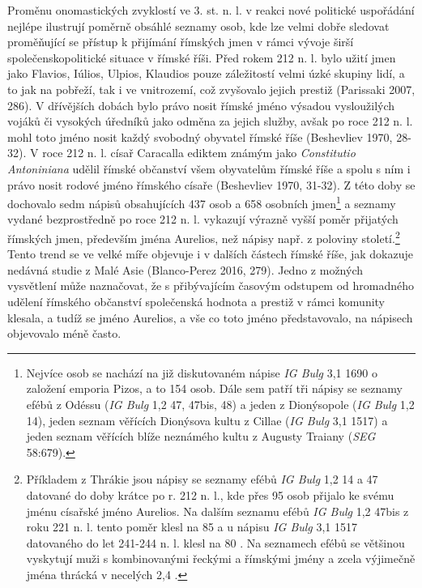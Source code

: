 Proměnu onomastických zvyklostí ve 3. st. n. l. v reakci nové politické uspořádání nejlépe ilustrují poměrně obsáhlé seznamy osob, kde lze velmi dobře sledovat proměňující se přístup k přijímání římských jmen v rámci vývoje širší společenskopolitické situace v římské říši. Před rokem 212 n. l. bylo užití jmen jako Flavios, Iúlios, Ulpios, Klaudios pouze záležitostí velmi úzké skupiny lidí, a to jak na pobřeží, tak i ve vnitrozemí, což zvyšovalo jejich prestiž (Parissaki 2007, 286). V dřívějších dobách bylo právo nosit římské jméno výsadou vysloužilých vojáků či vysokých úředníků jako odměna za jejich služby, avšak po roce 212 n. l. mohl toto jméno nosit každý svobodný obyvatel římské říše (Beshevliev 1970, 28-32). V roce 212 n. l. císař Caracalla ediktem známým jako {\em Constitutio Antoniniana} udělil římské občanství všem obyvatelům římské říše a spolu s ním i právo nosit rodové jméno římského císaře (Beshevliev 1970, 31-32). Z této doby se dochovalo sedm nápisů obsahujících 437 osob a 658 osobních jmen\footnote{Nejvíce osob se nachází na již diskutovaném nápise {\em IG Bulg} 3,1 1690 o založení emporia Pizos, a to 154 osob. Dále sem patří tři nápisy se seznamy efébů z Odéssu ({\em IG Bulg} 1,2 47, 47bis, 48) a jeden z Dionýsopole ({\em IG Bulg} 1,2 14), jeden seznam věřících Dionýsova kultu z Cillae ({\em IG Bulg} 3,1 1517) a jeden seznam věřících blíže neznámého kultu z Augusty Traiany ({\em SEG} 58:679).} a seznamy vydané bezprostředně po roce 212 n. l. vykazují výrazně vyšší poměr přijatých římských jmen, především jména Aurelios, než nápisy např. z poloviny století.\footnote{Příkladem z Thrákie jsou nápisy se seznamy efébů {\em IG Bulg} 1,2 14 a 47 datované do doby krátce po r. 212 n. l., kde přes 95  osob přijalo ke svému jménu císařské jméno Aurelios. Na dalším seznamu efébů {\em IG Bulg} 1,2 47bis z roku 221 n. l. tento poměr klesl na 85  a u nápisu {\em IG Bulg} 3,1 1517 datovaného do let 241-244 n. l. klesl na 80 . Na seznamech efébů se většinou vyskytují muži s kombinovanými řeckými a římskými jmény a zcela výjimečně jména thrácká v necelých 2,4 .} Tento trend se ve velké míře objevuje i v dalších částech římské říše, jak dokazuje nedávná studie z Malé Asie (Blanco-Perez 2016, 279). Jedno z možných vysvětlení může naznačovat, že s přibývajícím časovým odstupem od hromadného udělení římského občanství společenská hodnota a prestiž v rámci komunity klesala, a tudíž se jméno Aurelios, a vše co toto jméno představovalo, na nápisech objevovalo méně často.

